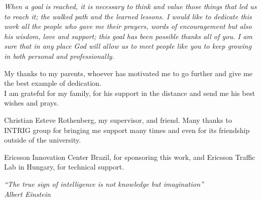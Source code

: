 

\tableofcontents*
\cleardoublepage

\begin{dedicatoria}
    \vspace*{\fill}
    \centering
    \noindent
    \textit{When a goal is reached, it is necessary to think and value those things that led us to reach it; the walked path and the learned lessons.  I would like to dedicate this work all the people who gave me their prayers, words of encouragement but also his wisdom, love and support; this goal has been possible thanks all of you.  I am sure that in any place God will allow us to meet  people like you to keep growing in both personal and professionally.} 
    
    \vspace*{\fill}
\end{dedicatoria}

\begin{agradecimentos}
   
My thanks to my parents, whoever has motivated me to go further and give me the best example of dedication. \\
I am grateful for my family, for his support in the distance and send me his best wishes and prays.

Christian Esteve Rothenberg, my supervisor, and friend.
Many thanks to INTRIG group for bringing me support many times and even for its friendship outside of the university.

Ericsson Innovation Center Brazil, for sponsoring this work, and Ericsson Traffic Lab in Hungary, for technical support.




    
    
\end{agradecimentos}

\begin{epigrafe}
    \vspace*{\fill}
	\begin{flushright}
		\textit{``The true sign of intelligence is not knowledge but imagination''\\
		Albert Einstein}
	\end{flushright}
\end{epigrafe}


